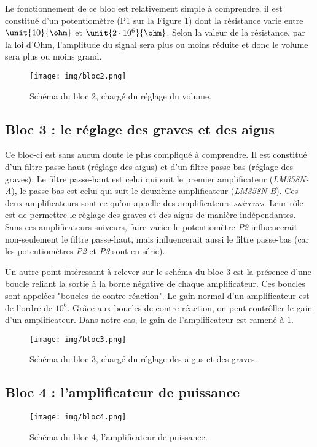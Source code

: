 \documentclass{article}
\begin{document}
Le fonctionnement de ce bloc est relativement simple à comprendre, il est constitué d'un potentiomètre (P1 sur la Figure \ref{bloc2}) dont la résistance varie entre $\unit{10}{\ohm}$ et $\unit{2 \cdot 10^{6}}{\ohm}$. Selon la valeur de la résistance, par la loi d'Ohm, l'amplitude du signal sera plus ou moins réduite et donc le volume sera plus ou moins grand.

\begin{figure}[h]
	\centering
	\texttt{[image: img/bloc2.png]}
	\caption{Schéma du bloc 2, chargé du réglage du volume.}
	\label{bloc2}
\end{figure}

\subsection{Bloc 3 : le réglage des graves et des aigus}

Ce bloc-ci est sans aucun doute le plus compliqué à comprendre. Il est constitué d'un filtre passe-haut (réglage des aigus) et d'un filtre passe-bas (réglage des graves). Le filtre passe-haut est celui qui suit le premier amplificateur (\textit{LM358N-A}), le passe-bas est celui qui suit le deuxième amplificateur (\textit{LM358N-B}). Ces deux amplificateurs sont ce qu'on appelle des amplificateurs \textit{suiveurs}. Leur rôle est de permettre le règlage des graves et des aigus de manière indépendantes. Sans ces amplificateurs suiveurs, faire varier le potentiomètre \textit{P2} influencerait non-seulement le filtre passe-haut, mais influencerait aussi le filtre passe-bas (car les potentiomètres \textit{P2} et \textit{P3} sont en série).

Un autre point intéressant à relever sur le schéma du bloc 3 est la présence d'une boucle reliant la sortie à la borne négative de chaque amplificateur. Ces boucles sont appelées "boucles de contre-réaction". Le gain normal d'un amplificateur est de l'ordre de $10^{6}$. Grâce aux boucles de contre-réaction, on peut contrôller le gain d'un amplificateur. Dans notre cas, le gain de l'amplificateur est ramené à $1$.

\begin{figure}[h]
	\centering
	\texttt{[image: img/bloc3.png]}
	\caption{Schéma du bloc 3, chargé du réglage des aigus et des graves.}
	\label{bloc3}
\end{figure}


\subsection{Bloc 4 : l'amplificateur de puissance}

\begin{figure}[h]
	\centering
	\texttt{[image: img/bloc4.png]}
	\caption{Schéma du bloc 4, l'amplificateur de puissance.}
	\label{bloc4}
\end{figure}

\end{document}

